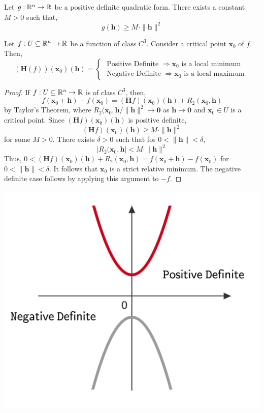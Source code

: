 \begin{prop}
    Let $g: \mathbb{R}^n \rightarrow \mathbb{R}$ be a positive definite quadratic form. There exists a constant $M > 0$ such that,
    \[g(\mathbf{h}) \geq M \cdot \|\mathbf{h}\|^2\]
\end{prop}

\begin{thm}
   Let $f: U \subseteq \mathbb{R}^n \rightarrow \mathbb{R}$ be a function of class $C^3$. Consider a critical point $\mathbf{x}_0$ of $f$. Then,
   \[
   (\mathbf{H}(f))\left(\mathbf{x}_0\right)(\mathbf{h})=\left\{\begin{array}{l}\text { Positive Definite } \Rightarrow \mathbf{x}_0 \text { is a local minimum } \\ \text { Negative Definite } \Rightarrow \mathbf{x}_0 \text { is a local maximum }\end{array}\right.
   \]
\end{thm}

\begin{proof}
    If $f: U \subseteq \mathbb{R}^n \rightarrow \mathbb{R}$ is of class $C^3$, then,
    \[f(\mathbf{x}_0 + \mathbf{h}) - f(\mathbf{x}_0) = (\mathbf{H}f)(\mathbf{x}_0)(\mathbf{h}) + R_2(\mathbf{x}_0, \mathbf{h})\]
    by Taylor's Theorem, where $R_2(\mathbf{x}_0, \mathbf{h} / \|\mathbf{h}\|^2 \rightarrow \mathbf{0}$ as $\mathbf{h} \rightarrow \mathbf{0}$ and $\mathbf{x}_0 \in U$ is a critical point. Since $(\mathbf{H}f)(\mathbf{x}_0)(\mathbf{h})$ is positive definite,
    \[(\mathbf{H}f)(\mathbf{x}_0)(\mathbf{h}) \geq M \cdot \|\mathbf{h}\|^2\]
    for some $M > 0$. There exists $\delta > 0$ such that for $0 < \|\mathbf{h}\| < \delta$, 
    \[|R_2(\mathbf{x}_0, \mathbf{h}| < M \cdot \|\mathbf{h}\|^2\]
    Thus, $0< (\mathbf{H}f) \left(\mathbf{x}_0\right)(\mathbf{h})+R_2\left(\mathbf{x}_0, \mathbf{h}\right)=f\left(\mathbf{x}_0+\mathbf{h}\right)-f\left(\mathbf{x}_0\right)$ for $0<\|\mathbf{h}\|<\delta$. It follows that $\mathbf{x}_0$ is a strict relative minimum. The negative definite case follows by applying this argument to $-f$.
\end{proof}

\begin{marginfigure}
\begin{center}
    \includegraphics[width=0.7\linewidth]{figures/wk-4/fig-42.png}
\end{center}
\end{marginfigure}

